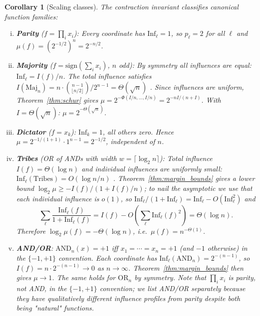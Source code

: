 \documentclass[11pt]{article}
\newtheorem{corollary}[theorem]{Corollary}
\newcommand{\Inf}{\mathrm{Inf}}
\newcommand{\sign}{\mathrm{sign}}
\begin{document}
\begin{corollary}[Scaling classes]
\label{cor:scaling}
The contraction invariant classifies canonical function families:
\begin{enumerate}[(i)]
    \item \textbf{Parity} ($f = \prod_i x_i$): Every coordinate has $\Inf_\ell = 1$, so $p_\ell = 2$ for all $\ell$ and $\mu(f) = (2^{-1/2})^n = 2^{-n/2}$.

    \item \textbf{Majority} ($f = \sign(\sum_i x_i)$, $n$ odd): By symmetry all influences are equal: $\Inf_\ell = I(f)/n$. The total influence satisfies $I(\mathrm{Maj}_n) = n \cdot \binom{n-1}{\lfloor n/2 \rfloor}/2^{n-1} = \Theta(\sqrt{n})$ \cite{odonnell2014analysis}. Since influences are uniform, Theorem~\ref{thm:schur} gives $\mu = 2^{-\Phi(I/n, \ldots, I/n)} = 2^{-nI/(n+I)}$. With $I = \Theta(\sqrt{n})$: $\mu = 2^{-\Theta(\sqrt{n})}$.

    \item \textbf{Dictator} ($f = x_k$): $\Inf_k = 1$, all others zero. Hence $\mu = 2^{-1/(1+1)} \cdot 1^{n-1} = 2^{-1/2}$, independent of $n$.

    \item \textbf{Tribes} (OR of ANDs with width $w = \lceil \log_2 n \rceil$): Total influence $I(f) = \Theta(\log n)$ and individual influences are uniformly small: $\Inf_\ell(\mathrm{Tribes}) = O(\log n / n)$ \cite{odonnell2014analysis}. Theorem~\ref{thm:margin_bounds} gives a \emph{lower} bound $\log_2 \mu \ge -I(f)/(1+I(f)/n)$; to nail the asymptotic we use that each individual influence is $o(1)$, so $\Inf_\ell/(1+\Inf_\ell) = \Inf_\ell - O(\Inf_\ell^2)$ and
\[
\sum_\ell \frac{\Inf_\ell(f)}{1+\Inf_\ell(f)} = I(f) - O\!\left(\sum_\ell \Inf_\ell(f)^2\right) = \Theta(\log n).
\]
Therefore $\log_2 \mu(f) = -\Theta(\log n)$, i.e.\ $\mu(f) = n^{-\Theta(1)}$.

    \item \textbf{AND/OR}: $\mathrm{AND}_n(x) = +1$ iff $x_1 = \cdots = x_n = +1$ (and $-1$ otherwise) in the $\{-1,+1\}$ convention. Each coordinate has $\Inf_\ell(\mathrm{AND}_n) = 2^{-(n-1)}$, so $I(f) = n \cdot 2^{-(n-1)} \to 0$ as $n \to \infty$. Theorem~\ref{thm:margin_bounds} then gives $\mu \to 1$. The same holds for $\mathrm{OR}_n$ by symmetry. Note that $\prod_i x_i$ is \emph{parity}, not AND, in the $\{-1,+1\}$ convention; we list AND/OR separately because they have qualitatively different influence profiles from parity despite both being "natural" functions.
\end{enumerate}
\end{corollary}
\end{document}
